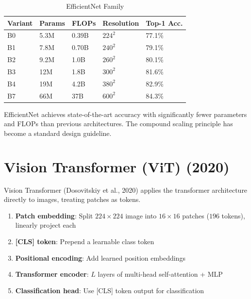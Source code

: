 \begin{table}[ht]
    \centering
    \caption{EfficientNet Family}
    \begin{tabular}{L{2cm} L{2cm} L{2cm} L{3cm} L{2.5cm}}
        \toprule
        \textbf{Variant} & \textbf{Params} & \textbf{FLOPs} & \textbf{Resolution} & \textbf{Top-1 Acc.} \\
        \midrule
        B0 & 5.3M & 0.39B & $224^2$ & 77.1\% \\
        B1 & 7.8M & 0.70B & $240^2$ & 79.1\% \\
        B2 & 9.2M & 1.0B & $260^2$ & 80.1\% \\
        B3 & 12M & 1.8B & $300^2$ & 81.6\% \\
        B4 & 19M & 4.2B & $380^2$ & 82.9\% \\
        B7 & 66M & 37B & $600^2$ & 84.3\% \\
        \bottomrule
    \end{tabular}
\end{table}

EfficientNet achieves state-of-the-art accuracy with significantly fewer parameters and FLOPs than previous architectures. The compound scaling principle has become a standard design guideline.

\section{Vision Transformer (ViT) (2020)}

Vision Transformer (Dosovitskiy et al., 2020) applies the transformer architecture directly to images, treating patches as tokens.

\begin{architecture}
\begin{enumerate}
    \item \textbf{Patch embedding}: Split $224 \times 224$ image into $16 \times 16$ patches ($196$ tokens), linearly project each
    \item \textbf{[CLS] token}: Prepend a learnable class token
    \item \textbf{Positional encoding}: Add learned position embeddings
    \item \textbf{Transformer encoder}: $L$ layers of multi-head self-attention + MLP
    \item \textbf{Classification head}: Use [CLS] token output for classification
\end{enumerate}
\end{architecture}

